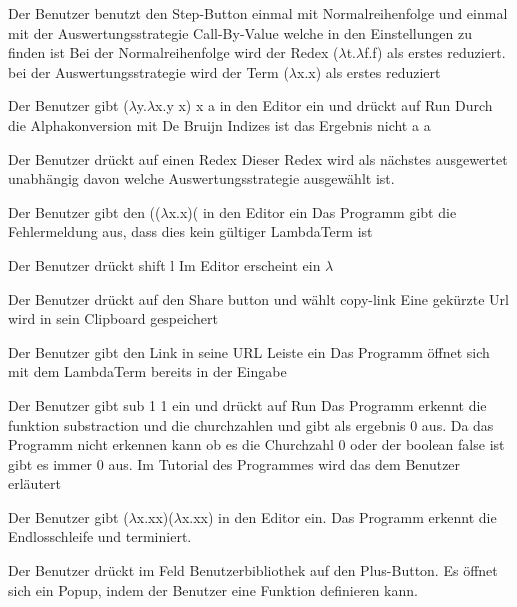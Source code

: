 \documentclass[parskip=full,11pt,twoside]{scrartcl}
\begin{document}
{Der Benutzer benutzt den Step-Button einmal mit Normalreihenfolge  und einmal mit der Auswertungsstrategie Call-By-Value welche in den Einstellungen zu finden ist}
{ Bei der Normalreihenfolge wird der Redex ($\lambda$t.$\lambda$f.f) als erstes reduziert. bei der Auswertungsstrategie wird der Term ($\lambda$x.x) als erstes reduziert }

{ Der Benutzer gibt ($\lambda$y.$\lambda$x.y x) x a in den Editor ein und drückt auf Run}
{ Durch die Alphakonversion mit De Bruijn Indizes ist das Ergebnis nicht a  a  }

 { Der Benutzer drückt auf einen Redex}
{ Dieser Redex wird als nächstes ausgewertet unabhängig davon welche Auswertungsstrategie ausgewählt ist. }

{ Der Benutzer gibt den (($\lambda$x.x)( in den Editor ein }
{ Das Programm gibt die Fehlermeldung aus, dass dies kein gültiger LambdaTerm ist }

{ Der Benutzer drückt shift l }
{Im Editor erscheint ein $\lambda$}

{ Der Benutzer drückt auf den Share button und wählt copy-link}
{ Eine gekürzte Url wird in sein Clipboard gespeichert }

{Der Benutzer gibt den Link in seine URL Leiste ein }
{ Das Programm öffnet sich mit dem LambdaTerm bereits in der Eingabe }

{ Der Benutzer gibt sub 1 1 ein und drückt auf Run }
{ Das Programm erkennt die funktion substraction und die churchzahlen und gibt als ergebnis 0 aus. Da das Programm nicht erkennen kann ob es die Churchzahl 0 oder der boolean false ist gibt es immer 0 aus. Im Tutorial des Programmes wird das dem Benutzer erläutert }

{Der Benutzer gibt ($\lambda$x.xx)($\lambda$x.xx) in den Editor ein.}
{Das Programm erkennt die Endlosschleife und terminiert.}

{Der Benutzer drückt im Feld Benutzerbibliothek auf den Plus-Button.}
{Es öffnet sich ein Popup, indem der Benutzer eine Funktion definieren kann.}
\end{document}
